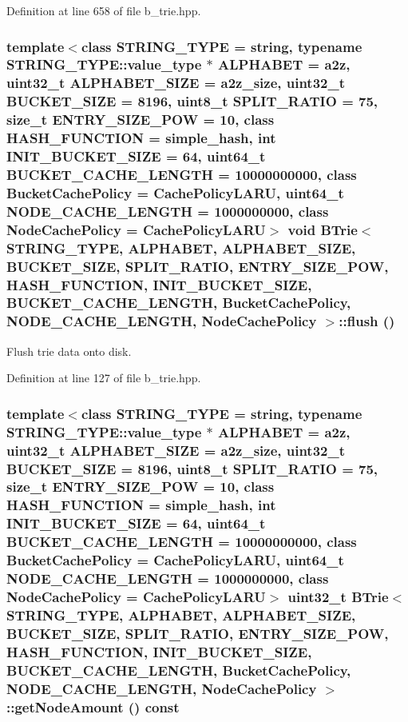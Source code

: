 Definition at line 658 of file b\_\-trie.hpp.\hypertarget{classBTrie_bfa4a5883b5b6146af18c53a35e85b34}{
\subsubsection[{flush}]{\setlength{\rightskip}{0pt plus 5cm}template$<$class STRING\_\-TYPE  = string, typename STRING\_\-TYPE::value\_\-type $\ast$ ALPHABET = a2z, uint32\_\-t ALPHABET\_\-SIZE = a2z\_\-size, uint32\_\-t BUCKET\_\-SIZE = 8196, uint8\_\-t SPLIT\_\-RATIO = 75, size\_\-t ENTRY\_\-SIZE\_\-POW = 10, class HASH\_\-FUNCTION  = simple\_\-hash, int INIT\_\-BUCKET\_\-SIZE = 64, uint64\_\-t BUCKET\_\-CACHE\_\-LENGTH = 10000000000, class BucketCachePolicy  = CachePolicyLARU, uint64\_\-t NODE\_\-CACHE\_\-LENGTH = 1000000000, class NodeCachePolicy  = CachePolicyLARU$>$ void {\bf BTrie}$<$ STRING\_\-TYPE, ALPHABET, ALPHABET\_\-SIZE, BUCKET\_\-SIZE, SPLIT\_\-RATIO, ENTRY\_\-SIZE\_\-POW, HASH\_\-FUNCTION, INIT\_\-BUCKET\_\-SIZE, BUCKET\_\-CACHE\_\-LENGTH, BucketCachePolicy, NODE\_\-CACHE\_\-LENGTH, NodeCachePolicy $>$::flush ()}}
\label{classBTrie_bfa4a5883b5b6146af18c53a35e85b34}


Flush trie data onto disk. 

Definition at line 127 of file b\_\-trie.hpp.\hypertarget{classBTrie_71cd037bb6ec881966cc91264377e35e}{
\subsubsection[{getNodeAmount}]{\setlength{\rightskip}{0pt plus 5cm}template$<$class STRING\_\-TYPE  = string, typename STRING\_\-TYPE::value\_\-type $\ast$ ALPHABET = a2z, uint32\_\-t ALPHABET\_\-SIZE = a2z\_\-size, uint32\_\-t BUCKET\_\-SIZE = 8196, uint8\_\-t SPLIT\_\-RATIO = 75, size\_\-t ENTRY\_\-SIZE\_\-POW = 10, class HASH\_\-FUNCTION  = simple\_\-hash, int INIT\_\-BUCKET\_\-SIZE = 64, uint64\_\-t BUCKET\_\-CACHE\_\-LENGTH = 10000000000, class BucketCachePolicy  = CachePolicyLARU, uint64\_\-t NODE\_\-CACHE\_\-LENGTH = 1000000000, class NodeCachePolicy  = CachePolicyLARU$>$ uint32\_\-t {\bf BTrie}$<$ STRING\_\-TYPE, ALPHABET, ALPHABET\_\-SIZE, BUCKET\_\-SIZE, SPLIT\_\-RATIO, ENTRY\_\-SIZE\_\-POW, HASH\_\-FUNCTION, INIT\_\-BUCKET\_\-SIZE, BUCKET\_\-CACHE\_\-LENGTH, BucketCachePolicy, NODE\_\-CACHE\_\-LENGTH, NodeCachePolicy $>$::getNodeAmount () const}}
\label{classBTrie_71cd037bb6ec881966cc91264377e35e}


